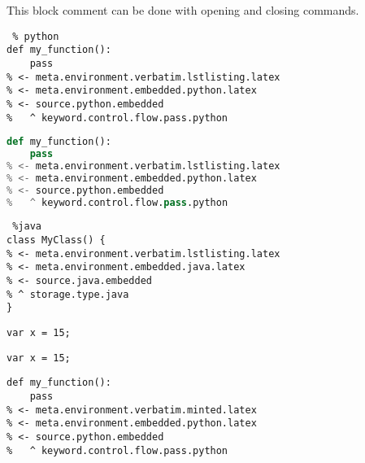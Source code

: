 \documentclass[12pt]{article}
\begin{document}
\comment
This block comment can be done with
opening and closing commands.
\endcomment



\begin{lstlisting} % python
def my_function():
    pass
% <- meta.environment.verbatim.lstlisting.latex
% <- meta.environment.embedded.python.latex
% <- source.python.embedded
%   ^ keyword.control.flow.pass.python
\end{lstlisting}

\begin{lstlisting}[frame=single,
                   language=python] %python
def my_function():
    pass
% <- meta.environment.verbatim.lstlisting.latex
% <- meta.environment.embedded.python.latex
% <- source.python.embedded
%   ^ keyword.control.flow.pass.python
\end{lstlisting}

\begin{lstlisting} %java
class MyClass() {
% <- meta.environment.verbatim.lstlisting.latex
% <- meta.environment.embedded.java.latex
% <- source.java.embedded
% ^ storage.type.java
}
\end{lstlisting}

\lstinline{var x = 15;}

\lstinline|var x = 15;|



\begin{verbatim}
def my_function():
    pass
% <- meta.environment.verbatim.minted.latex
% <- meta.environment.embedded.python.latex
% <- source.python.embedded
%   ^ keyword.control.flow.pass.python
\end{verbatim}
\end{document}
